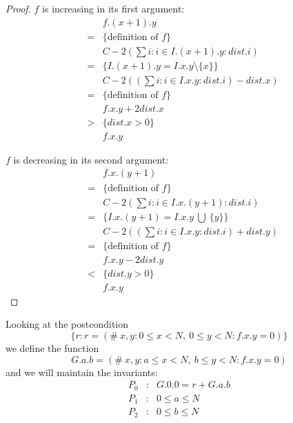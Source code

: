 \begin{proof}
$f$ is increasing in its first argument:
\begin{equation*}
\begin{array}{lcl}
		&& f.(x + 1).y \\
	      &=& \{ \mbox{definition of $f$} \} \\      
                  && C - 2 (\sum i: i \in I.(x + 1).y : dist.i) \\
                &=& \{  I.(x + 1).y = I.x.y \setminus \{x\} \} \\
                  &&  C - 2((\sum i: i \in I.x.y : dist.i) - dist.x)  \\
                 &=& \{ \mbox{definition of $f$} \} \\
                 && f.x.y + 2 dist.x \\
                 &>& \{ dist.x > 0 \} \\
                && f.x.y
   \end{array}
\end{equation*}

$f$ is decreasing in its second argument:
\begin{equation*}
\begin{array}{lcl}
		&& f.x.(y + 1) \\
	      &=& \{ \mbox{definition of $f$} \} \\      
                  && C - 2 (\sum i: i \in I.x .(y + 1) : dist.i) \\
                &=& \{  I.x.(y + 1) = I.x.y\ \bigcup\  \{y\} \} \\
                  &&  C - 2((\sum i: i \in I.x.y : dist.i) + dist.y)  \\
                 &=& \{ \mbox{definition of $f$} \} \\
                 && f.x.y - 2 dist.y \\
                 &<& \{ dist.y > 0 \} \\
                && f.x.y
   \end{array}
\end{equation*}
\end{proof}

\noindent Looking at the postcondition 
\begin{equation*}
\{r: r = (\#\ x, y: 0 \leq x < N,\  0 \leq y < N: f.x.y = 0) \}
\end{equation*}
 we define the function
 \begin{equation*}
 G.a.b = (\#\ x, y: a \leq x < N,\  b \leq y < N: f.x.y = 0)
\end{equation*}
and we will maintain the invariants:
\begin{equation*}
\begin{array}{lcl}
     P_0 &:& G.0.0 = r + G.a.b \\      
     P_1 &:& 0 \leq a \leq N\\
     P_2 &:& 0 \leq b \leq N
   \end{array}
\end{equation*}

